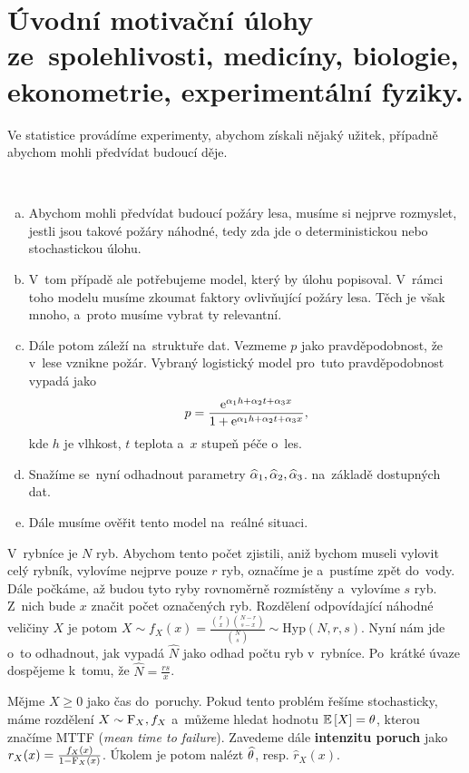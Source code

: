 \chapter{Úvodní motivační úlohy ze~spolehlivosti, medicíny, biologie, ekonometrie, experimentální fyziky.}
Ve statistice provádíme experimenty, abychom získali nějaký užitek, případně abychom mohli předvídat budoucí děje. 

\begin{example}~
	 \begin{enumerate}[a)]
		\item Abychom mohli předvídat budoucí požáry lesa, musíme si nejprve rozmyslet, jestli jsou takové požáry náhodné, tedy zda jde o deterministickou nebo stochastickou úlohu. 
		\item V~tom případě ale potřebujeme model, který by úlohu popisoval. V~rámci toho modelu musíme zkoumat faktory ovlivňující požáry lesa. Těch je však mnoho, a~proto musíme vybrat ty relevantní. 
		\item Dále potom záleží na~struktuře dat. Vezmeme $p$ jako pravděpodobnost, že v~lese vznikne požár. Vybraný logistický model pro~tuto pravděpodobnost vypadá jako
		$$ p=\frac{\mathrm{e}^{\alpha_1 h+\alpha_2t+\alpha_3x}}{1+\mathrm{e}^{\alpha_1 h+\alpha_2 t+\alpha_3 x}}, $$
		kde $h$ je vlhkost, $t$ teplota a~$x$ stupeň péče o~les.
		\item Snažíme se~nyní odhadnout parametry $\widehat{\alpha}_1,\widehat{\alpha}_2,\widehat{\alpha}_3$. na~základě dostupných dat.
		\item Dále musíme ověřit tento model na~reálné situaci.
	\end{enumerate} 
\end{example}
\begin{example} V~rybníce je $N$ ryb. Abychom tento počet zjistili, aniž bychom museli vylovit celý rybník, vylovíme nejprve pouze $r$ ryb, označíme je a~pustíme zpět do~vody. Dále počkáme, až budou tyto ryby rovnoměrně rozmístěny a~vylovíme $s$ ryb. Z~nich bude $x$ značit počet označených ryb. Rozdělení odpovídající náhodné veličiny $X$ je potom $X\sim f_X(x)=\frac{\binom{r}{x}\binom{N-r}{s-x}}{\binom{N}{s}}\sim\mathrm{Hyp}(N,r,s)$. Nyní nám jde o~to odhadnout, jak vypadá $\widehat{N}$ jako odhad počtu ryb v~rybníce. Po~krátké úvaze dospějeme k~tomu, že $\widehat{N}=\frac{rs}{x}$.
\end{example}
\begin{example}
	Mějme $X\geq0$ jako čas do~poruchy. Pokud tento problém řešíme stochasticky, máme rozdělení $X\sim \mathrm{F}_X,f_X$ a~můžeme hledat hodnotu $\mathbb{E}\left[ X \right]=\theta$, kterou značíme MTTF (\textit{mean time to failure}). Zavedeme dále \textbf{intenzitu poruch} jako $r_X(x)=\frac{f_X(x)}{1-\mathrm{F}_X(x)}$. Úkolem je potom nalézt $\widehat{\theta}$, resp. $\widehat{r}_X(x)$.
\end{example}
